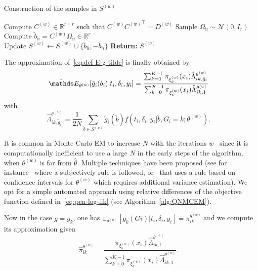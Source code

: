 \documentclass[11pt]{article}
\newcommand{\cN}{\mathcal N}
\newcommand{\R}{\mathds R}
\newcommand{\E}{\mathds E}
\begin{document}
\vspace{.5cm}

\begin{algorithm}[H]
\DontPrintSemicolon
\caption{Construction of the samples in $S^{(w)}$}
\label{alg:construct-set-S}
Compute $C^{(w)} \in \R^{r \times r}$ such that $C^{(w)}{C^{(w)}}^\top = D^{(w)}$ 
{ 
  Sample $\Omega_{\breve{n}} \sim \cN(0, I_r)$ \\
  Compute $\breve{b}_{\breve{n}} = C^{(w)} \Omega_{\breve{n}} \in \R^r$ \\
  Update $S^{(w)} \leftarrow S^{(w)} \cup \{\breve{b}_{\breve{n}}, -\breve{b}_{\breve{n}} \}$
}
\textbf{Return:} {$S^{(w)}$}
\end{algorithm}

\vspace{.5cm}

\noindent The approximation of~\eqref{eq:def-E-g-tilde} is finally obtained by
\begin{equation}
  \label{eq:def-hat-E-g-tilde}
  \hat \E_{\theta^{(w)}}[ \tilde g_i(b_i) | t_i, \delta_i, y_i] = \dfrac{ \sum_{k=0}^{K-1} \pi_{\xi_k^{(w)}}(x_i) \hat \Lambda_{ik,\tilde g_i}^{\theta^{(w)}}}{\sum_{k=0}^{K-1} \pi_{\xi_k^{(w)}}(x_i) \hat \Lambda_{ik,1}^{\theta^{(w)}}}
\end{equation}
with
\begin{equation}
  \label{eq:hat_Lambda_ik}
  \hat \Lambda_{ik,\tilde g_i}^{\theta^{(w)}} = \dfrac{1}{2N} \sum_{\breve{b} \in S^{(w)}} \tilde g_i(\breve{b}) f(t_i, \delta_i, y_i | \breve{b}, G_i = k ; \theta^{(w)}).
\end{equation}

It is common in Monte Carlo EM to increase $N$ with the iterations $w$~\citep{wei1990monte} since it is computationally inefficient to use a large $N$ in the early steps of the algorithm, when $\theta^{(w)}$ is far from $\hat \theta$. Multiple techniques have been proposed (see for instance~\citet{law2002joint} where a subjectively rule is followed, or~\citet{booth1999maximizing} that uses a rule based on confidence intervals for $\theta^{(w)}$ which requires additional variance estimation). We opt for a simple automated approach using relative differences of the objective function defined in~\eqref{eq:pen-log-lik} (see Algorithm~\ref{alg:QNMCEM}).

Now in the case $g = g_k$, one has $\E_{\theta^{(w)}}[g_k(Gi) | t_i, \delta_i, y_i] = \pi_{ik}^{\theta^{(w)}}$ and we compute its approximation given
\begin{equation}
\label{eq:hat_pi_ik-def}
  \hat \pi_{ik}^{\theta^{(w)}} = \dfrac{\pi_{\xi_k^{(w)}}(x_i) \hat \Lambda_{ik,1}^{\theta^{(w)}}}{\sum_{k=0}^{K-1} \pi_{\xi_k^{(w)}}(x_i) \hat \Lambda_{ik,1}^{\theta^{(w)}}}.
\end{equation}
\end{document}
